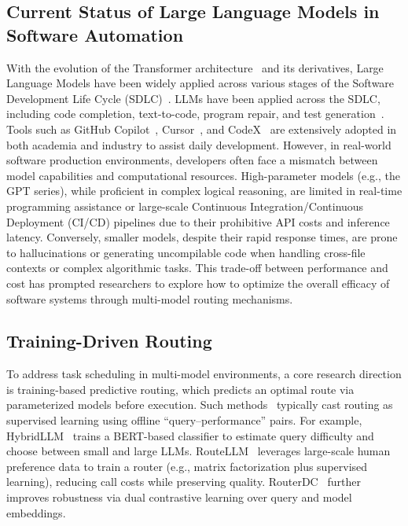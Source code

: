 \documentclass[acmsmall,screen,review,anonymous]{acmart}
\begin{document}
\subsection{Current Status of Large Language Models in Software Automation}
With the evolution of the Transformer architecture~\cite{vaswani2017attention} and its derivatives, Large Language Models have been widely applied across various stages of the Software Development Life Cycle (SDLC)~\cite{fan2023large}. LLMs have been applied across the SDLC, including code completion, text-to-code, program repair, and test generation~\cite{fan2023large,ghaemi2024transformers,celik2025review}. Tools such as GitHub Copilot~\cite{githubcopilot}, Cursor~\cite{cursor_docs}, and CodeX~\cite{chen2021codex} are extensively adopted in both academia and industry to assist daily development. However, in real-world software production environments, developers often face a mismatch between model capabilities and computational resources. High-parameter models (e.g., the GPT series), while proficient in complex logical reasoning, are limited in real-time programming assistance or large-scale Continuous Integration/Continuous Deployment (CI/CD) pipelines due to their prohibitive API costs and inference latency. Conversely, smaller models, despite their rapid response times, are prone to hallucinations or generating uncompilable code when handling cross-file contexts or complex algorithmic tasks. This trade-off between performance and cost has prompted researchers to explore how to optimize the overall efficacy of software systems through multi-model routing mechanisms.

\subsection{Training-Driven Routing}
To address task scheduling in multi-model environments, a core research direction is training-based predictive routing, which predicts an
optimal route via parameterized models before execution. Such methods~\cite{lu2024routing,liu2024optllm,sikeridis2025pickllm,barrak2025cargo}
typically cast routing as supervised learning using offline ``query--performance'' pairs. For example, HybridLLM~\cite{ding2024hybrid} trains a
BERT-based classifier to estimate query difficulty and choose between small and large LLMs. RouteLLM~\cite{ong2024routellm} leverages large-scale
human preference data to train a router (e.g., matrix factorization plus supervised learning), reducing call costs while preserving quality.
RouterDC~\cite{chen2024routerdc} further improves robustness via dual contrastive learning over query and model embeddings.
\end{document}
